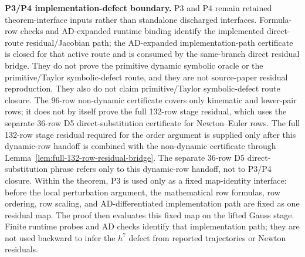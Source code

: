 \documentclass[preprint,12pt]{elsarticle}
\begin{document}
\noindent\textbf{P3/P4 implementation-defect boundary.}
P3 and P4 remain retained
theorem-interface inputs rather than standalone discharged interfaces.
Formula-row checks and AD-expanded runtime binding identify
the implemented direct-route residual/Jacobian path; the AD-expanded
implementation-path certificate is closed for that active route and is
consumed by the same-branch direct residual bridge.
They do not prove the primitive dynamic symbolic oracle or the
primitive/Taylor symbolic-defect route, and they are not source-paper residual
reproduction. They also do not claim primitive/Taylor symbolic-defect route
closure. The 96-row non-dynamic certificate covers only kinematic and
lower-pair rows; it does not by itself prove the full 132-row stage residual,
which uses the separate 36-row D5 direct-substitution certificate for
Newton--Euler rows. The full 132-row stage residual required for the order
argument is supplied only after this dynamic-row handoff is combined with the
non-dynamic certificate through Lemma~\ref{lem:full-132-row-residual-bridge}.
The separate 36-row D5 direct-substitution phrase refers only to this
dynamic-row handoff, not to P3/P4 closure.
Within the theorem, P3 is used only as a fixed map-identity interface: before
the local perturbation argument, the mathematical row formulas, row ordering,
row scaling, and AD-differentiated implementation path are fixed as one
residual map. The proof then evaluates this fixed map on the lifted Gauss
stage. Finite runtime probes and AD checks identify that implementation path;
they are not used backward to infer the \(h^7\) defect from reported
trajectories or Newton residuals.
\end{document}
